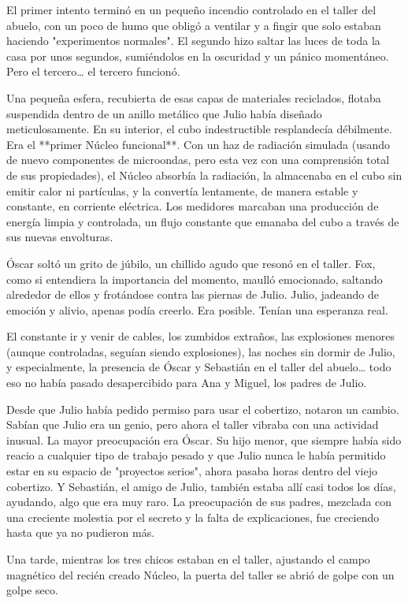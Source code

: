\documentclass[a4paper,12pt]{book}
\begin{document}
El primer intento terminó en un pequeño incendio controlado en el taller del abuelo, con un poco de humo que obligó a ventilar y a fingir que solo estaban haciendo "experimentos normales". El segundo hizo saltar las luces de toda la casa por unos segundos, sumiéndolos en la oscuridad y un pánico momentáneo. Pero el tercero… el tercero funcionó.

Una pequeña esfera, recubierta de esas capas de materiales reciclados, flotaba suspendida dentro de un anillo metálico que Julio había diseñado meticulosamente. En su interior, el cubo indestructible resplandecía débilmente. Era el **primer Núcleo funcional**. Con un haz de radiación simulada (usando de nuevo componentes de microondas, pero esta vez con una comprensión total de sus propiedades), el Núcleo absorbía la radiación, la almacenaba en el cubo sin emitir calor ni partículas, y la convertía lentamente, de manera estable y constante, en corriente eléctrica. Los medidores marcaban una producción de energía limpia y controlada, un flujo constante que emanaba del cubo a través de sus nuevas envolturas.

Óscar soltó un grito de júbilo, un chillido agudo que resonó en el taller. Fox, como si entendiera la importancia del momento, maulló emocionado, saltando alrededor de ellos y frotándose contra las piernas de Julio. Julio, jadeando de emoción y alivio, apenas podía creerlo. Era posible. Tenían una esperanza real.

El constante ir y venir de cables, los zumbidos extraños, las explosiones menores (aunque controladas, seguían siendo explosiones), las noches sin dormir de Julio, y especialmente, la presencia de Óscar y Sebastián en el taller del abuelo… todo eso no había pasado desapercibido para Ana y Miguel, los padres de Julio.

Desde que Julio había pedido permiso para usar el cobertizo, notaron un cambio. Sabían que Julio era un genio, pero ahora el taller vibraba con una actividad inusual. La mayor preocupación era Óscar. Su hijo menor, que siempre había sido reacio a cualquier tipo de trabajo pesado y que Julio nunca le había permitido estar en su espacio de "proyectos serios", ahora pasaba horas dentro del viejo cobertizo. Y Sebastián, el amigo de Julio, también estaba allí casi todos los días, ayudando, algo que era muy raro. La preocupación de sus padres, mezclada con una creciente molestia por el secreto y la falta de explicaciones, fue creciendo hasta que ya no pudieron más.

Una tarde, mientras los tres chicos estaban en el taller, ajustando el campo magnético del recién creado Núcleo, la puerta del taller se abrió de golpe con un golpe seco.
\end{document}

